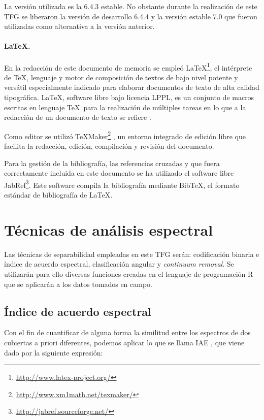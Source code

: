 La versión utilizada es la 6.4.3 estable. No obstante durante la realización de este \ac{TFG} se liberaron la versión de desarrollo 6.4.4 y la versión estable 7.0 que fueron utilizadas como alternativa a la versión anterior.

\paragraph{\LaTeX.}
En la redacción de este documento de memoria se empleó \LaTeX\footnote{\url{http://www.latex-project.org/}}, el intérprete de \TeX, lenguaje y motor de composición de textos de bajo nivel potente y versátil especialmente indicado para elaborar documentos de texto de alta calidad tipográfica. \LaTeX, software libre bajo licencia LPPL, es un conjunto de macros escritas en lenguaje \TeX\ para la realización de múltiples tareas en lo que a la redacción de un documento de texto se refiere \citep{Latex2011} \citep{galindo2001} \citep{lamport1994}.%

Como editor se utilizó TeXMaker\footnote{\url{http://www.xm1math.net/texmaker/}} \citep{Brachet2003}, un entorno integrado de edición libre que facilita la redacción, edición, compilación y revisión del documento.%

Para la gestión de la bibliografía, las referencias cruzadas y que fuera correctamente incluida en este documento se ha utilizado el software libre JabRef\footnote{\url{http://jabref.sourceforge.net/}}. Este software compila la bibliografía mediante BibTeX, el formato estándar de bibliografía de \LaTeX.

\section{Técnicas de análisis espectral} \label{sec:tecnicas}
Las técnicas de separabilidad empleadas en este \ac{TFG} serán: codificación binaria e índice de acuerdo espectral, clasificación angular y \textit{continuum removal}. Se utilizarán para ello diversas funciones creadas en el lenguaje de programación R que se aplicarán a los datos tomados en campo.

\subsection{Índice de acuerdo espectral}
Con el fin de cuantificar de alguna forma la similitud entre los espectros de dos cubiertas a priori diferentes, podemos aplicar lo que se llama \ac{IAE} \citep{chuvieco2002teledeteccion}, que viene dado por la siguiente expresión:


